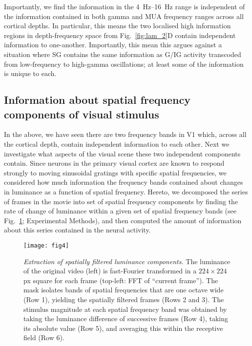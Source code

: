 Importantly, we find the information in the \SIrange{4}{16}{Hz} range is independent of the information contained in both gamma and \ac{MUA} frequency ranges across all cortical depths.
In particular, this means the two localised high information regions in depth-frequency space from Fig.~\ref{fig:lam_2}D contain independent information to one-another.
Importantly, this mean this argues against a situation where \ac{SG} contains the same information as \ac{G}/\ac{IG} activity transcoded from low-frequency to high-gamma oscillations; at least some of the information is unique to each.

\subsection{Information about spatial frequency components of visual stimulus}
In the above, we have seen there are two frequency bands in \ac{V1} which, across all the cortical depth, contain independent information to each other.
Next we investigate what aspects of the visual scene these two independent components contain.
Since neurons in the primary visual cortex are known to respond strongly to moving sinusoidal gratings with specific spatial frequencies, we considered how much information the frequency bands contained about changes in luminance as a function of spatial frequency.
Hereto, we decomposed the series of frames in the movie into set of spatial frequency components by finding the rate of change of luminance within a given set of spatial frequency bands (see Fig.~\ref{fig:lam_4}; Experimental Methods), and then computed the amount of information about this series contained in the neural activity.

\begin{figure}[htbp]
\centering \texttt{[image: fig4]}
%
\caption{%
\textit{Extraction of spatially filtered luminance components.}
The luminance of the original video (left) is 
fast-Fourier transformed in a $224 \times 224$ px square for each frame (top-left: \ac{FFT} of 
``current frame'').
The mask isolates bands of spatial frequencies that are one octave wide (Row 1), yielding 
the spatially filtered frames (Rows 2 and 3).
The stimulus magnitude at each spatial frequency band was obtained 
by taking the luminance difference of successive frames (Row 4), 
taking its absolute value (Row 5), 
and averaging this within the receptive field (Row 6).
}%
\label{fig:lam_4}
%
\end{figure}

